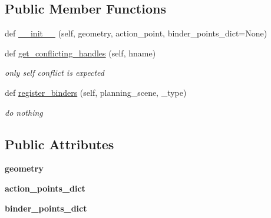 \subsection*{Public Member Functions}
\begin{DoxyCompactItemize}
\item 
def \hyperlink{classrnb-planning_1_1src_1_1pkg_1_1planning_1_1constraint_1_1constraint__object_1_1_single_handle_object_a5d4952258a58ee264c0b697a21df2c02}{\+\_\+\+\_\+init\+\_\+\+\_\+} (self, geometry, action\+\_\+point, binder\+\_\+points\+\_\+dict=None)
\item 
def \hyperlink{classrnb-planning_1_1src_1_1pkg_1_1planning_1_1constraint_1_1constraint__object_1_1_single_handle_object_a2a3af0e8337bb576587c4e92f90b7303}{get\+\_\+conflicting\+\_\+handles} (self, hname)
\begin{DoxyCompactList}\small\item\em only self conflict is expected \end{DoxyCompactList}\item 
\mbox{\label{classrnb-planning_1_1src_1_1pkg_1_1planning_1_1constraint_1_1constraint__object_1_1_single_handle_object_afd76e164ba6fb676385054896c20ac02}} 
def \hyperlink{classrnb-planning_1_1src_1_1pkg_1_1planning_1_1constraint_1_1constraint__object_1_1_single_handle_object_afd76e164ba6fb676385054896c20ac02}{register\+\_\+binders} (self, planning\+\_\+scene, \+\_\+type)
\begin{DoxyCompactList}\small\item\em do nothing \end{DoxyCompactList}\end{DoxyCompactItemize}
\subsection*{Public Attributes}
\begin{DoxyCompactItemize}
\item 
\mbox{\label{classrnb-planning_1_1src_1_1pkg_1_1planning_1_1constraint_1_1constraint__object_1_1_single_handle_object_ab03ef049e36539cda0538e3b4579beea}} 
{\bfseries geometry}
\item 
\mbox{\label{classrnb-planning_1_1src_1_1pkg_1_1planning_1_1constraint_1_1constraint__object_1_1_single_handle_object_a1a8cf4555e638f6890793fc3e420f47d}} 
{\bfseries action\+\_\+points\+\_\+dict}
\item 
\mbox{\label{classrnb-planning_1_1src_1_1pkg_1_1planning_1_1constraint_1_1constraint__object_1_1_single_handle_object_a006634ed6f33e99beda4195d198febb7}} 
{\bfseries binder\+\_\+points\+\_\+dict}
\end{DoxyCompactItemize}


